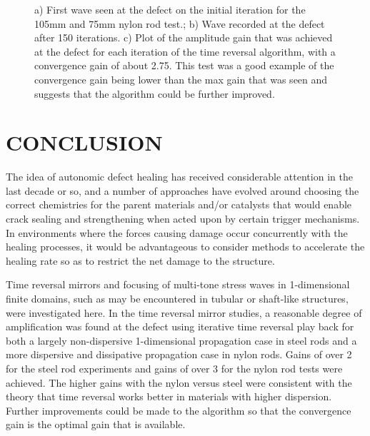 \documentclass[11pt,letterpaper]{article}%
\begin{document}
 \begin{figure}
\begin{subfigmatrix}{3}
\end{subfigmatrix}

   \caption[all]
   { \label{nylonExp3}
   a) First wave seen at the defect on the initial iteration for the 105mm and 75mm nylon rod test.; b) Wave recorded at the defect after 150 iterations. c) Plot of the amplitude gain that was achieved at the defect for each iteration of the time reversal algorithm, with a convergence gain of about 2.75. This test was a good example of the convergence gain being lower than the max gain that was seen and suggests that the algorithm could be further improved.
 }
\end{figure}


\section{CONCLUSION}
\label{sect:concl}

The idea of autonomic defect healing has received considerable
attention in the last decade or so, and a number of approaches
have evolved around choosing the correct chemistries for the
parent materials and/or catalysts that would enable crack sealing
and strengthening when acted upon by certain trigger mechanisms.
In environments where the forces causing damage occur concurrently
with the healing processes, it would be advantageous to consider
methods to accelerate the healing rate so as to restrict the net
damage to the structure.  

Time reversal mirrors and focusing of multi-tone stress waves in 1-dimensional
finite domains, such as may be encountered in tubular or
shaft-like structures, were investigated here. In the time reversal mirror studies, a reasonable degree of amplification was found at the defect using iterative
time reversal play back for both a largely non-dispersive
1-dimensional propagation case in steel rods and a more
dispersive and dissipative propagation case in nylon rods. Gains of over 2 for the steel rod experiments and gains of over 3 for the nylon rod tests were achieved. The higher gains with the nylon versus steel were consistent with the theory that time reversal works better in materials with higher dispersion. Further improvements could be made to the algorithm so that the convergence gain is the optimal gain that is available.
\end{document}
